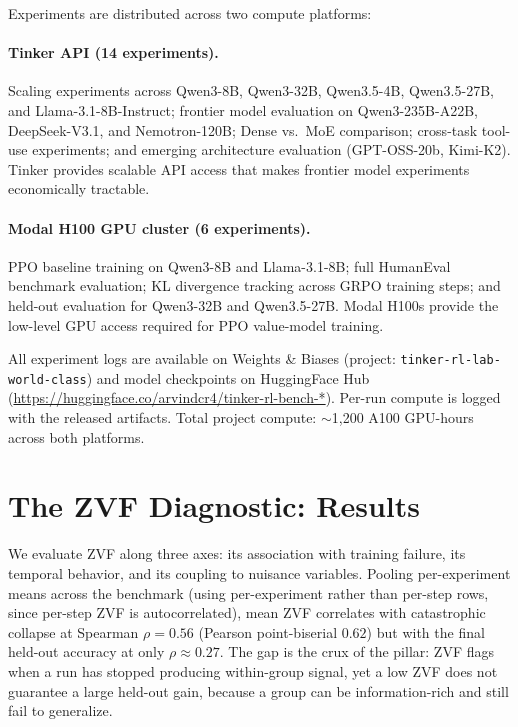 \documentclass{article}
\begin{document}
Experiments are distributed across two compute platforms:

\paragraph{Tinker API (14 experiments).}
Scaling experiments across Qwen3-8B, Qwen3-32B, Qwen3.5-4B, Qwen3.5-27B,
and Llama-3.1-8B-Instruct; frontier model evaluation on Qwen3-235B-A22B,
DeepSeek-V3.1, and Nemotron-120B; Dense vs.~MoE comparison; cross-task
tool-use experiments; and emerging architecture evaluation (GPT-OSS-20b,
Kimi-K2). Tinker provides scalable API access that makes frontier model
experiments economically tractable.

\paragraph{Modal H100 GPU cluster (6 experiments).}
PPO baseline training on Qwen3-8B and Llama-3.1-8B; full HumanEval
benchmark evaluation; KL divergence tracking across GRPO training steps;
and held-out evaluation for Qwen3-32B and Qwen3.5-27B. Modal H100s
provide the low-level GPU access required for PPO value-model training.

All experiment logs are available on Weights \& Biases (project:
\texttt{tinker-rl-lab-world-class}) and model checkpoints on HuggingFace
Hub (\url{https://huggingface.co/arvindcr4/tinker-rl-bench-*}).
Per-run compute is logged with the released artifacts. Total project compute:
$\sim$1,200 A100 GPU-hours across both platforms.

 \section{The ZVF Diagnostic: Results}
\label{sec:p2-results}
We evaluate ZVF along three axes: its association with training failure, its
temporal behavior, and its coupling to nuisance variables. Pooling per-experiment
means across the benchmark (using per-experiment rather than per-step rows, since
per-step ZVF is autocorrelated), mean ZVF correlates with catastrophic collapse
at Spearman $\rho = 0.56$ (Pearson point-biserial $0.62$) but with the final held-out accuracy at
only $\rho \approx 0.27$. The gap is the crux of the pillar: ZVF flags when a run
has stopped producing within-group signal, yet a low ZVF does not guarantee a
large held-out gain, because a group can be information-rich and still fail to
generalize.
\end{document}
